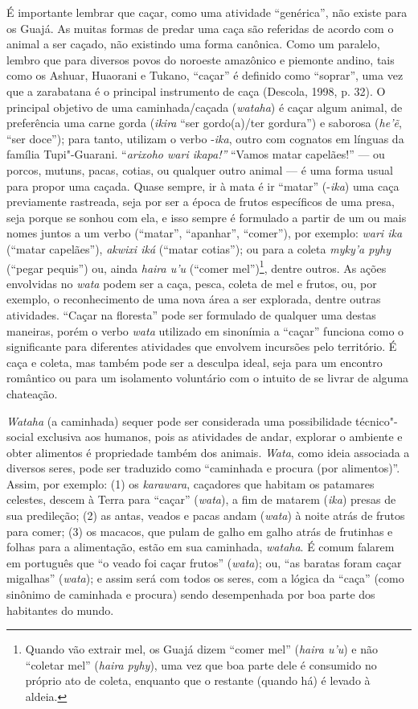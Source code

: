 É importante lembrar que caçar, como uma atividade ``genérica'', não
existe para os Guajá. As muitas formas de predar uma caça são referidas
de acordo com o animal a ser caçado, não existindo uma forma canônica.
Como um paralelo, lembro que para diversos povos do noroeste amazônico e
piemonte andino, tais como os Ashuar, Huaorani e Tukano, ``caçar'' é
definido como ``soprar'', uma vez que a zarabatana é o principal
instrumento de caça (Descola, 1998, p. 32). O principal objetivo de uma
caminhada/caçada (\emph{wataha}) é caçar algum animal, de preferência
uma carne gorda (\emph{ikira} ``ser gordo(a)/ter gordura'') e saborosa
(\emph{he'ẽ}, ``ser doce''); para tanto, utilizam o verbo -\emph{ika},
outro com cognatos em línguas da família Tupi"-Guarani. ``\emph{arixoho
wari ikapa!''} ``Vamos matar capelães!'' --- ou porcos, mutuns, pacas,
cotias, ou qualquer outro animal --- é uma forma usual para propor uma
caçada. Quase sempre, ir à mata é ir ``matar'' (-\emph{ika}) uma caça
previamente rastreada, seja por ser a época de frutos específicos de uma
presa, seja porque se sonhou com ela, e isso sempre é formulado a partir
de um ou mais nomes juntos a um verbo (``matar'', ``apanhar'', ``comer''), por
exemplo: \emph{wari ika} (``matar capelães''), \emph{akwixi iká} (``matar
cotias''); ou para a coleta \emph{myky'a pyhy} (``pegar pequis'') ou, ainda
\emph{haira u'u} (``comer mel'')\footnote{Quando vão extrair mel, os Guajá
  dizem ``comer mel'' (\emph{haira u'u}) e não ``coletar mel'' (\emph{haira}
  \emph{pyhy}), uma vez que boa parte dele é consumido no próprio ato de
  coleta, enquanto que o restante (quando há) é levado à aldeia.},
dentre outros. As ações envolvidas no \emph{wata} podem ser a caça,
pesca, coleta de mel e frutos, ou, por exemplo, o reconhecimento de uma
nova área a ser explorada, dentre outras atividades. ``Caçar na floresta''
pode ser formulado de qualquer uma destas maneiras, porém o verbo
\emph{wata} utilizado em sinonímia a ``caçar'' funciona como o
significante para diferentes atividades que envolvem incursões pelo
território. É caça e coleta, mas também pode ser a desculpa ideal, seja
para um encontro romântico ou para um isolamento voluntário com o
intuito de se livrar de alguma chateação.

\emph{Wataha} (a caminhada) sequer pode ser considerada uma
possibilidade técnico"-social exclusiva aos humanos, pois as atividades
de andar, explorar o ambiente e obter alimentos é propriedade também dos
animais. \emph{Wata}, como ideia associada a diversos seres, pode ser
traduzido como ``caminhada e procura (por alimentos)''. Assim, por
exemplo: (1) os \emph{karawara}, caçadores que habitam os patamares
celestes, descem à Terra para ``caçar'' (\emph{wata}), a fim de matarem
(\emph{ika}) presas de sua predileção; (2) as antas, veados e pacas
andam (\emph{wata}) à noite atrás de frutos para comer; (3) os macacos,
que pulam de galho em galho atrás de frutinhas e folhas para a
alimentação, estão em sua caminhada, \emph{wataha}. É comum falarem em
português que ``o veado foi caçar frutos'' (\emph{wata}); ou, ``as
baratas foram caçar migalhas'' (\emph{wata}); e assim será com todos os
seres, com a lógica da ``caça'' (como sinônimo de caminhada e procura)
sendo desempenhada por boa parte dos habitantes do mundo.

